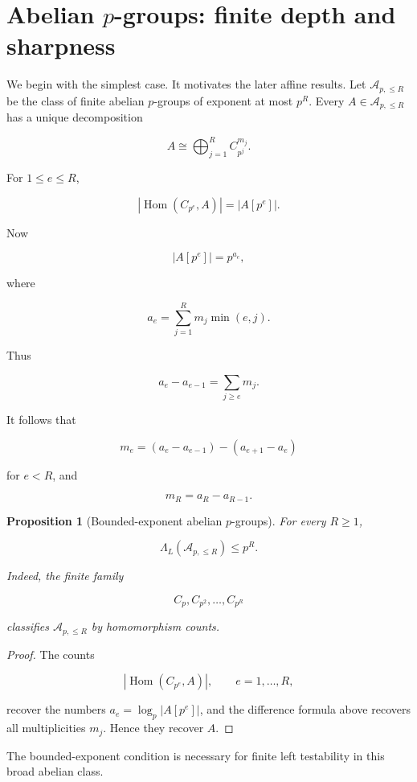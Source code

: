 \documentclass[11pt]{article}
\newtheorem{proposition}[theorem]{Proposition}
\begin{document}
\section{Abelian $p$-groups: finite depth and sharpness}

We begin with the simplest case. It motivates the later affine results. Let $\mathcal A_{p,\le R}$ be the class of finite abelian $p$-groups of exponent at most $p^R$. Every $A\in\mathcal A_{p,\le R}$ has a unique decomposition

\[
A\cong
\bigoplus_{j=1}^{R}C_{p^j}^{m_j}.
\]

For $1\le e\le R$,

\[
|\operatorname{Hom}(C_{p^e},A)|
=|A[p^e]|.
\]

Now

\[
|A[p^e]|
=p^{a_e},
\]

where

\[
a_e=
\sum_{j=1}^{R}m_j\min(e,j).
\]

Thus

\[
a_e-a_{e-1}
=\sum_{j\ge e}m_j.
\]

It follows that

\[
m_e
=(a_e-a_{e-1})-(a_{e+1}-a_e)
\]

for $e<R$, and

\[
m_R=a_R-a_{R-1}.
\]

\begin{proposition}[Bounded-exponent abelian $p$-groups]
For every $R\ge1$,

\[
\Lambda_L(\mathcal A_{p,\le R})\le p^R.
\]

Indeed, the finite family

\[
C_p,C_{p^2},\ldots,C_{p^R}
\]

classifies $\mathcal A_{p,\le R}$ by homomorphism counts.

\end{proposition}

\begin{proof}
The counts

\[
|\operatorname{Hom}(C_{p^e},A)|,\qquad e=1,\ldots,R,
\]

recover the numbers $a_e=\log_p|A[p^e]|$, and the difference formula above recovers all multiplicities $m_j$. Hence they recover $A$.

\end{proof}

The bounded-exponent condition is necessary for finite left testability in this broad abelian class.
\end{document}

